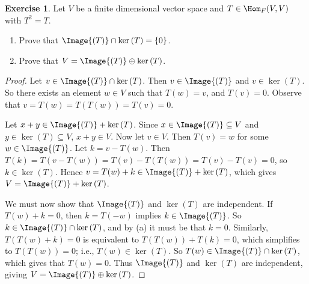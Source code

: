 \documentclass[10pt,twoside,openany]{memoir}
\theoremstyle{plain}
\theoremstyle{definition}
\newtheorem{exercise}{Exercise}
\theoremstyle{remark}
\numberwithin{equation}{section}
\begin{document}
    \begin{comment}
    \begin{exercise}
        Prove that there does not exist a $T \in \Hom_F{(F^5, F^2)}$ so that
            \begin{equation*}
            \begin{split}
                \ker{(T)} = \{(x_1,x_2,...,x_5) \in F^5 \mid x_1 = x_2 \hspace{4pt} \text{and} \hspace{4pt} x_3 = x_4 = x_5 \}.
            \end{split}
            \end{equation*}
    \end{exercise}
    \end{comment}
    \newpage
    \addtocounter{exercise}{4}
    \begin{exercise}
        Let $V$ be a finite dimensional vector space and $T \in \Hom_F{(V,V)}$ with $T^2 = T$.
            \begin{enumerate}[label = (\alph*)]
                \item Prove that $\Image{(T)} \cap \ker{(T)} = \{0\}$.
                \item Prove that $V = \Image{(T)} \oplus \ker{(T)}$.
            \end{enumerate}
    \end{exercise}
        \begin{proof}
            Let $v \in \Image{(T)} \cap \ker{(T)}$. Then $v \in \Image{(T)}$ and $v \in \ker{(T)}$. So there exists an element $w \in V$ such that $T(w) = v$, and $T(v) = 0$. Observe that $v = T(w) = T(T(w)) = T(v) = 0$.

            Let $x+y \in \Image{(T)} + \ker{(T)}$. Since $x \in \Image{(T)} \subseteq V$ and $y \in \ker{(T)} \subseteq V$, $x+y \in V$. Now let $v \in V$. Then $T(v) = w$ for some $w \in \Image{(T)}$. Let $k = v - T(w)$. Then $T(k) = T(v - T(w)) = T(v) - T(T(w)) = T(v) - T(v) = 0$, so $k \in \ker{(T)}$. Hence $v = T(w) + k \in \Image{(T)} + \ker{(T)}$, which gives $V = \Image{(T)} + \ker{(T)}$.
            
            We must now show that $\Image{(T)}$ and $\ker{(T)}$ are independent. If $T(w) + k = 0$, then $k = T(-w)$ implies $k \in \Image{(T)}$. So $k \in \Image{(T)} \cap \ker{(T)}$, and by (a) it must be that $k = 0$. Similarly, $T(T(w) + k) = 0$ is equivalent to $T(T(w)) + T(k) = 0$, which simplifies to $T(T(w)) = 0$; i.e., $T(w) \in \ker{(T)}$. So $T(w) \in \Image{(T)} \cap \ker{(T)}$, which gives that $T(w) = 0$. Thus $\Image{(T)}$ and $\ker{(T)}$ are independent, giving $V = \Image{(T)} \oplus \ker{(T)}$.
        \end{proof}
\end{document}
